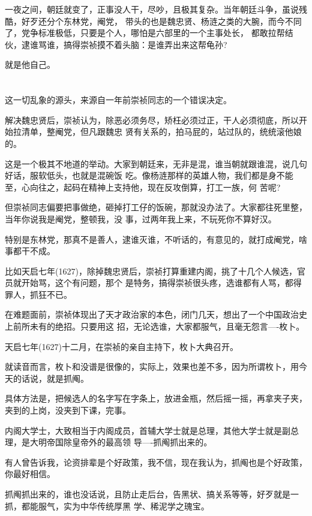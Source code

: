 \documentclass[11pt,a4paper,onecolumn]{article}
\begin{document}
一夜之间，朝廷就变了，正事没人干，尽吵，且极其复杂。当年朝廷斗争，虽说残酷，好歹还分个东林党，阉党，
带头的也是魏忠贤、杨涟之类的大腕，而今不同了，党争标准极低，只要是个人，哪怕是六部里的一个主事处长，
都敢拉帮结伙，逮谁骂谁，搞得崇祯摸不着头脑：是谁弄出来这帮龟孙?

就是他自己。

\section[\thesection]{}

这一切乱象的源头，来源自一年前崇祯同志的一个错误决定。

解决魏忠贤后，崇祯认为，除恶必须务尽，矫枉必须过正，干人必须彻底，所以开始拉清单，整阉党，但凡跟魏忠
贤有关系的，拍马屁的，站过队的，统统滚他娘的。

这是一个极其不地道的举动。大家到朝廷来，无非是混，谁当朝就跟谁混，说几句好话，服软低头，也就是混碗饭
吃。像杨涟那样的英雄人物，我们都是身不能至，心向往之，起码在精神上支持他，现在反攻倒算，打工一族，何
苦呢?

但崇祯同志偏要把事做绝，砸掉打工仔的饭碗，那就没办法了。大家都往死里整，当年你说我是阉党，整顿我，没
事，过两年我上来，不玩死你不算好汉。

特别是东林党，那真不是善人，逮谁灭谁，不听话的，有意见的，就打成阉党，啥事都干不成。

比如天启七年(1627)，除掉魏忠贤后，崇祯打算重建内阁，挑了十几个人候选，官员就开始骂，这个有问题，那个
是特务，搞得崇祯很头疼，选谁都有人骂，都得罪人，抓狂不已。

在难题面前，崇祯体现出了天才政治家的本色，闭门几天，想出了一个中国政治史上前所未有的绝招。只要用这
招，无论选谁，大家都服气，且毫无怨言----枚卜。

天启七年(1627)十二月，在崇祯的亲自主持下，枚卜大典召开。

就读音而言，枚卜和没谱是很像的，实际上，效果也差不多，因为所谓枚卜，用今天的话说，就是抓阄。

具体方法是，把候选人的名字写在字条上，放进金瓶，然后摇一摇，再拿夹子夹，夹到的上岗，没夹到下课，完事。

内阁大学士，大致相当于内阁成员，首辅大学士就是总理，其他大学士就是副总理，是大明帝国除皇帝外的最高领
导----抓阄抓出来的。

有人曾告诉我，论资排辈是个好政策，我不信，现在我认为，抓阄也是个好政策，你最好相信。

抓阄抓出来的，谁也没话说，且防止走后台，告黑状、搞关系等等，好歹就是一抓，都能服气，实为中华传统厚黑
学、稀泥学之瑰宝。
\end{document}
